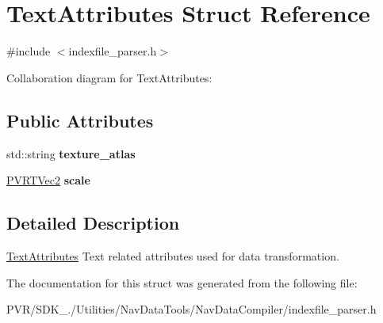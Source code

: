 \hypertarget{struct_text_attributes}{\section{Text\+Attributes Struct Reference}
\label{struct_text_attributes}
}


{\ttfamily \#include $<$indexfile\+\_\+parser.\+h$>$}



Collaboration diagram for Text\+Attributes\+:
\subsection*{Public Attributes}
\begin{DoxyCompactItemize}
\item 
\hypertarget{struct_text_attributes_a4b43547ffca172b7df2f8c7c4d925ac7}{std\+::string {\bfseries texture\+\_\+atlas}}\label{struct_text_attributes_a4b43547ffca172b7df2f8c7c4d925ac7}

\item 
\hypertarget{struct_text_attributes_a7f0da186bfb47141ff44cd363afb53f3}{\hyperlink{struct_p_v_r_t_vec2}{P\+V\+R\+T\+Vec2} {\bfseries scale}}\label{struct_text_attributes_a7f0da186bfb47141ff44cd363afb53f3}

\end{DoxyCompactItemize}


\subsection{Detailed Description}


  \hyperlink{struct_text_attributes}{Text\+Attributes}  Text related attributes used for data transformation. 

The documentation for this struct was generated from the following file\+:\begin{DoxyCompactItemize}
\item 
P\+V\+R/\+S\+D\+K\+\_./\+Utilities/\+Nav\+Data\+Tools/\+Nav\+Data\+Compiler/indexfile\+\_\+parser.\+h\end{DoxyCompactItemize}
